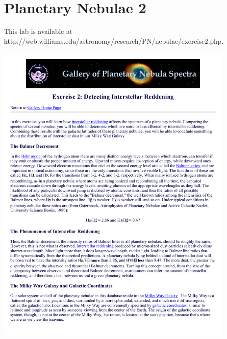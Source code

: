\section{Planetary Nebulae 2}

\makelabheader

This lab is available at http://web.williams.edu/astronomy/research/PN/nebulae/exercise2.php.

\includegraphics[height=6in]{pnb/pnb1.pdf}

